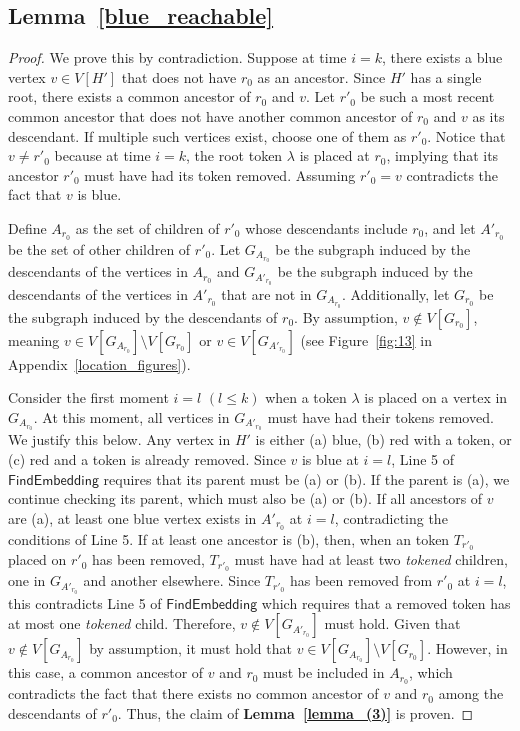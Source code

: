 \documentclass[runningheads]{llncs}
\theoremstyle{plain}
\theoremstyle{definition}
\begin{document}
\subsection{\textbf{Lemma~\ref{blue_reachable}}}\label{appendix_D6}
\begin{proof}
    We prove this by contradiction. Suppose at time $i = k$, there exists a blue vertex $v \in V[H']$ that does not have $r_0$ as an ancestor. Since $H'$ has a single root, there exists a common ancestor of $r_0$ and $v$. Let $r'_0$ be such a most recent common ancestor that does not have another common ancestor of $r_0$ and $v$ as its descendant. If multiple such vertices exist, choose one of them as $r'_0$. Notice that $v \neq r'_0$ because at time $i = k$, the root token $\lambda$ is placed at $r_0$, implying that its ancestor $r'_0$ must have had its token removed. Assuming $r'_0 = v$ contradicts the fact that $v$ is blue.
    
    Define $A_{r_0}$ as the set of children of $r'_0$ whose descendants include $r_0$, and let $A'_{r_0}$ be the set of other children of $r'_0$. Let $G_{A_{r_0}}$ be the subgraph induced by the descendants of the vertices in $A_{r_0}$ and $G_{A'_{r_0}}$ be the subgraph induced by the descendants of the vertices in $A'_{r_0}$ that are not in $G_{A_{r_0}}$. Additionally, let $G_{r_0}$ be the subgraph induced by the descendants of $r_0$. By assumption, $v \notin V[G_{r_0}]$, meaning $v \in V[G_{A_{r_0}}] \setminus V[G_{r_0}]$ or $v \in V[G_{A'_{r_0}}]$ (see Figure~\ref{fig:13} in Appendix~\ref{location_figures}).
    
    Consider the first moment $i = l$ $(l \leq k)$ when a token $\lambda$ is placed on a vertex in $G_{A_{r_0}}$. At this moment, all vertices in $G_{A'_{r_0}}$ must have had their tokens removed. We justify this below. Any vertex in $H'$ is either (a) blue, (b) red with a token, or (c) red and a token is already removed. Since $v$ is blue at $i = l$, Line 5 of $\mathsf{FindEmbedding}$ requires that its parent must be (a) or (b). If the parent is (a), we continue checking its parent, which must also be (a) or (b). If all ancestors of $v$ are (a), at least one blue vertex exists in $A'_{r_0}$ at $i = l$, contradicting the conditions of Line 5. If at least one ancestor is (b), then, when an token $T_{r'_0}$ placed on $r'_0$ has been removed, $T_{r'_0}$ must have had at least two \textit{tokened} children, one in $G_{A'_{r_0}}$ and another elsewhere. Since $T_{r'_0}$ has been removed from $r'_0$ at $i = l$, this contradicts Line 5 of $\mathsf{FindEmbedding}$ which requires that a removed token has at most one \textit{tokened} child. Therefore, $v \notin V[G_{A'_{r_0}}]$ must hold. Given that $v \notin V[G_{A_{r_0}}]$ by assumption, it must hold that $v \in V[G_{A_{r_0}}] \setminus V[G_{r_0}]$. However, in this case, a common ancestor of $v$ and $r_0$ must be included in $A_{r_0}$, which contradicts the fact that there exists no common ancestor of $v$ and $r_0$ among the descendants of $r'_0$. Thus, the claim of \textbf{Lemma~\ref{lemma_(3)}} is proven.
\end{proof}
\end{document}
